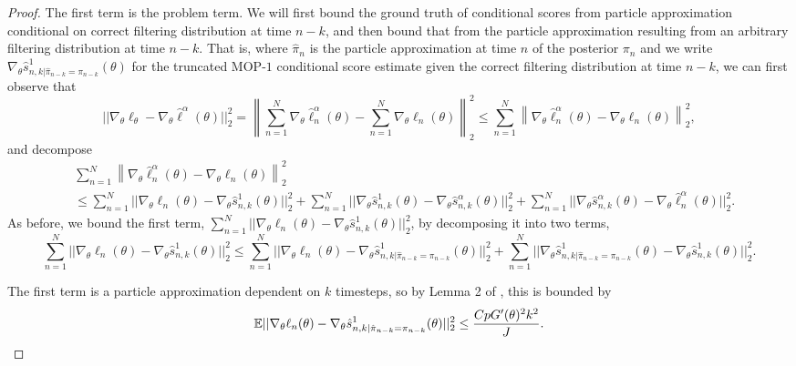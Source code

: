 \begin{proof}
The first term is the problem term. We will first bound the ground truth of conditional scores from particle approximation conditional on correct filtering distribution at time $n-k$, and then bound that from the particle approximation resulting from an arbitrary filtering distribution at time $n-k$. That is, where $\hat\pi_n$ is the particle approximation at time $n$ of the posterior $\pi_n$ and we write $\nabla_\theta\hat s_{n,k|\hat\pi_{n-k}=\pi_{n-k}}^1(\theta)$ for the truncated MOP-$1$ conditional score estimate given the correct filtering distribution at time $n-k$, we can first observe that
\begin{equation}
    ||\nabla_\theta\ell_\theta - \nabla_\theta \hat\ell^\alpha(\theta)||_2^2 =  \left\lVert\sum_{n=1}^N \nabla_\theta \hat\ell_n^\alpha(\theta) - \sum_{n=1}^N \nabla_\theta \ell_n(\theta)\right\rVert_2^2 \leq \sum_{n=1}^N\left\lVert \nabla_\theta \hat\ell_n^\alpha(\theta) -  \nabla_\theta \ell_n(\theta)\right\rVert_2^2,
\end{equation}
and decompose
\begin{align}
    &\sum_{n=1}^N\left\lVert \nabla_\theta \hat\ell_n^\alpha(\theta) -  \nabla_\theta \ell_n(\theta)\right\rVert_2^2 \\
    &\leq \sum_{n=1}^N||\nabla_\theta\ell_n(\theta) - \nabla_\theta\hat s_{n,k}^1(\theta)||_2^2 + \sum_{n=1}^N||\nabla_\theta\hat s_{n,k}^1(\theta) - \nabla_\theta\hat s_{n,k}^\alpha(\theta)||_2^2 + \sum_{n=1}^N||\nabla_\theta\hat s_{n,k}^\alpha(\theta) -  \nabla_\theta\hat\ell_n^\alpha(\theta)||_2^2.
\end{align}
As before, we bound the first term, $\sum_{n=1}^N||\nabla_\theta\ell_n(\theta) - \nabla_\theta\hat s_{n,k}^1(\theta)||_2^2$, by decomposing it into two terms, 
$$\sum_{n=1}^N||\nabla_\theta\ell_n(\theta) - \nabla_\theta\hat s_{n,k}^1(\theta)||_2^2 \leq \sum_{n=1}^N ||\nabla_\theta\ell_n(\theta) - \nabla_\theta\hat s_{n,k|\hat\pi_{n-k}=\pi_{n-k}}^1(\theta)||_2^2 + \sum_{n=1}^N ||\nabla_\theta\hat s_{n,k|\hat\pi_{n-k}=\pi_{n-k}}^1(\theta) - \nabla_\theta\hat s_{n,k}^1(\theta)||_2^2.$$

The first term is a particle approximation dependent on $k$ timesteps, so by Lemma 2 of \cite{karjalainen23}, this is bounded by
$$\mathbb{E}||\nabla_\theta\ell_n(\theta) - \nabla_\theta\hat s_{n,k|\hat\pi_{n-k}=\pi_{n-k}}^1(\theta)||_2^2 \leq \frac{CpG'(\theta)^2k^2}{J}.$$


\end{proof}
